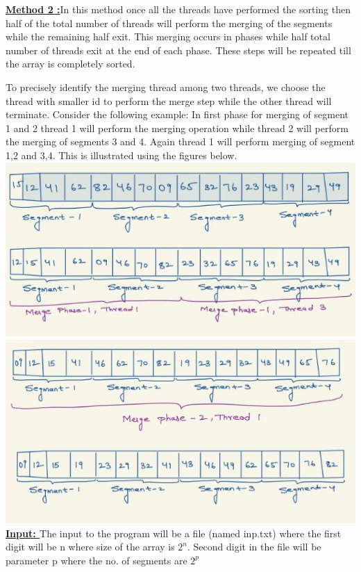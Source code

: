 \documentclass{article}
\begin{document}
\noindent\textbf{\underline {Method 2 :}}In this method once all the threads have performed the sorting then half of the total number of threads will perform the merging of the segments while the remaining half exit. This merging occurs in phases while half total number of threads exit at the end of each phase. These steps will be repeated till the array is completely sorted. 

To precisely identify the merging thread among two threads, we choose the thread with smaller id to perform the merge step while the other thread will terminate. Consider the following example: In first phase for merging of segment 1 and 2 thread 1 will perform the merging operation while thread 2 will perform the merging of segments 3 and 4. Again thread 1 will perform merging of segment 1,2 and 3,4. This is illustrated using the figures below. \\ 



\includegraphics[width=\textwidth]{M-2,IMg1.JPG}
\includegraphics[width=\textwidth]{M-2,img2.JPG}\\
\noindent\textbf{\underline {Input: }}The input to the program will be a file (named inp.txt) where the first digit will be n where size of the array is $2^n$. Second digit in the file will be parameter p where the no. of segments are $2^p$
\\
\end{document}
